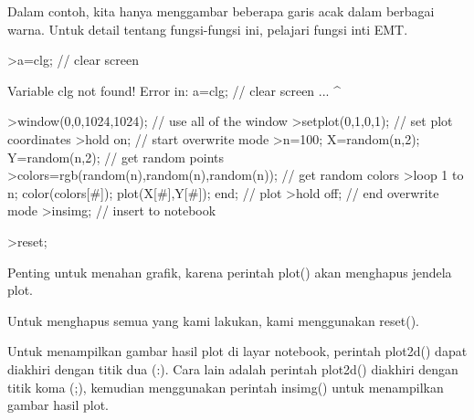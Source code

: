 \documentclass[a4paper,10pt]{article}
\begin{document}
\begin{eulernotebook}
\begin{eulercomment}
\begin{eulercomment}
\begin{eulercomment}
\begin{eulercomment}
\begin{eulercomment}
\begin{eulercomment}
\begin{eulercomment}
\begin{eulercomment}
\begin{eulercomment}
\begin{eulercomment}
\begin{eulercomment}
\begin{eulercomment}
\begin{eulercomment}
\begin{eulercomment}
\begin{eulercomment}
Dalam contoh, kita hanya menggambar beberapa garis acak dalam berbagai
warna. Untuk detail tentang fungsi-fungsi ini, pelajari fungsi inti
EMT.
\end{eulercomment}
\begin{eulerprompt}
>a=clg; // clear screen
\end{eulerprompt}
\begin{euleroutput}
  Variable clg not found!
  Error in:
  a=clg; // clear screen ...
       ^
\end{euleroutput}
\begin{eulerprompt}
>window(0,0,1024,1024); // use all of the window
>setplot(0,1,0,1); // set plot coordinates
>hold on; // start overwrite mode
>n=100; X=random(n,2); Y=random(n,2);  // get random points
>colors=rgb(random(n),random(n),random(n)); // get random colors
>loop 1 to n; color(colors[#]); plot(X[#],Y[#]); end; // plot
>hold off; // end overwrite mode
>insimg; // insert to notebook
\end{eulerprompt}
\begin{eulerprompt}
>reset;
\end{eulerprompt}
\begin{eulercomment}
Penting untuk menahan grafik, karena perintah plot() akan menghapus
jendela plot.

Untuk menghapus semua yang kami lakukan, kami menggunakan reset().

Untuk menampilkan gambar hasil plot di layar notebook, perintah
plot2d() dapat diakhiri dengan titik dua (:). Cara lain adalah
perintah plot2d() diakhiri dengan titik koma (;), kemudian menggunakan
perintah insimg() untuk menampilkan gambar hasil plot.


\end{eulercomment}
\end{eulercomment}
\end{eulercomment}
\end{eulercomment}
\end{eulercomment}
\end{eulercomment}
\end{eulercomment}
\end{eulercomment}
\end{eulercomment}
\end{eulercomment}
\end{eulercomment}
\end{eulercomment}
\end{eulercomment}
\end{eulercomment}
\end{eulercomment}
\end{eulernotebook}
\end{document}
